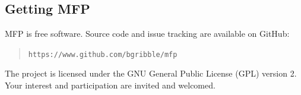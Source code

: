 \documentclass[a4paper]{article}
\begin{document}
\subsection{Getting MFP}

MFP is free software. Source code and issue tracking are available on GitHub:

\begin{quote}
\texttt{https://www.github.com/bgribble/mfp}
\end{quote}

The project is licensed under the GNU General Public License (GPL) version
2. Your interest and participation are invited and welcomed.

\nocite{*}


\end{document}
